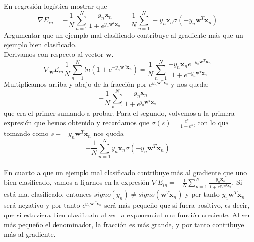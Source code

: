 \documentclass[12pt]{article}
\theoremstyle{definition}
\begin{document}
\begin{pregunta}
En regresión logística mostrar que 
\[
	\nabla E_{in} = -\frac{1}{N}\sum_{n=1}^N\frac{y_n\mathbf{x}_n}{1+e^{y_n\mathbf{w}^T\mathbf{x}_n}} = \frac{1}{N}\sum_{n=1}^N-y_n\mathbf{x}_n\sigma(-y_n\mathbf{w}^T\mathbf{x}_n)
\]
Argumentar que un ejemplo mal clasificado contribuye al gradiente más que un ejemplo bien clasificado.\\

Derivamos con respecto al vector $\mathbf{w}$.
\[	\nabla_\mathbf{w} E_{in} \frac{1}{N}\sum_{n=1}^Nln(1+e^{-y_n\mathbf{w}^T\mathbf{x}_n}) = \frac{1}{N} \sum_{n=1}^N\frac{-y_n\mathbf{x}_ne^{-y_n\mathbf{w}^T\mathbf{x}_n}}{1+e^{-y_n\mathbf{w}^T\mathbf{x}_n}}	\]
Multiplicamos arriba y abajo de la fracción por $e^{y_n\mathbf{w}^T\mathbf{x}_n}$ y nos queda:
\[ -\frac{1}{N} \sum_{n=1}^N\frac{y_n\mathbf{x}_n}{1+e^{y_n\mathbf{w}^T\mathbf{x}_n}}	\]
que era el primer sumando a probar. Para el segundo, volvemos a la primera expresión que hemos obtenido y recordamos que $\sigma(s)=\frac{e^s}{1+e^s}$, con lo que tomando como $s=-y_n\mathbf{w}^T\mathbf{x}_n$ nos queda
\[	-\frac{1}{N} \sum_{n=1}^N y_n\mathbf{x}_n \sigma(-y_n\mathbf{w}^T\mathbf{x}_n)	\]\\

En cuanto a que un ejemplo mal clasificado contribuye más al gradiente que uno bien clasificado, vamos a fijarnos en la expresión $\nabla E_{in} = -\frac{1}{N}\sum_{n=1}^N\frac{y_n\mathbf{x}_n}{1+e^{y_n\mathbf{w}^T\mathbf{x}_n}}$. Si está mal clasificado, entonces $signo(y_n)\neq signo(\mathbf{w}^T\mathbf{x}_n)$ y por tanto $y_n\mathbf{w}^T\mathbf{x}_n$ será negativo y por tanto $e^{y_n\mathbf{w}^T\mathbf{x}_n}$ será más pequeño que si fuera positivo, es decir, que si estuviera bien clasificado al ser la exponencial una función creciente. Al ser más pequeño el denominador, la fracción es más grande, y por tanto contribuye más al gradiente.
\end{pregunta}
\end{document}
